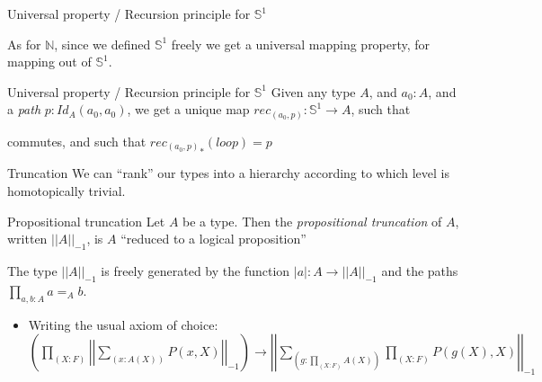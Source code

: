 \documentclass{beamer}
\newcommand{\NN}{\mathbb{N}}
\newcommand{\SSS}{\mathbb{S}}
\begin{document}

\begin{frame}{Universal property / Recursion principle for $\SSS^1$}

As for $\NN$, since we defined $\SSS^1$ freely we get a universal mapping property, for mapping out of $\SSS^1$.

	\pause\begin{block}{Universal property / Recursion principle for $\SSS^1$}
 Given any type $A$, and $a_0 : A$, and a \emph{path} $p : Id_A(a_0,a_0)$, \pause we get a unique map $rec_{(a_0,p)} : \SSS^1 \to A$, \pause such that
 
 \begin{center}\end{center}
commutes, and such that ${rec_{(a_0,p)}}_*(loop) = p$
\end{block}

\end{frame}


\begin{frame}{Truncation}
	 We can ``rank'' our types into a hierarchy according to which level is homotopically trivial. 
	
	\pause\begin{block}{Propositional truncation}
	Let $A$ be a type. Then the \textit{propositional truncation} of $A$, written $||A||_{-1}$, is $A$ ``reduced to a logical proposition''
	\end{block}
	
	\pause The type $|| A ||_{-1}$ is freely generated by the function $|a|:A\to||A||_{-1}$ and the paths $\prod_{a,b:A}a=_Ab$.
	
	\begin{itemize}
	\pause\item Writing the usual axiom of choice: \\
	$\left(\prod_{(X:F)}\left|\left|\sum_{(x:A(X))}P(x,X)\right|\right|_{-1}\right)\to\left|\left|\sum_{(g:\prod_{(X:F)}A(X))}\prod_{(X:F)}P(g(X),X)\right|\right|_{-1}$
	\end{itemize}	

\end{frame}
\end{document}
